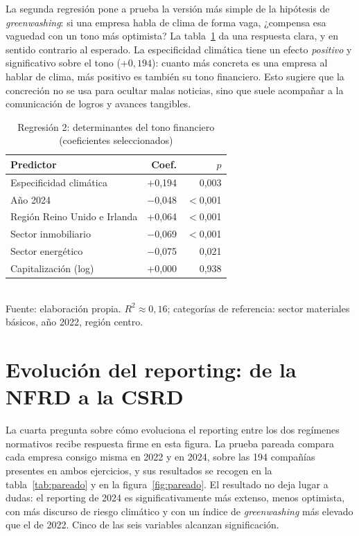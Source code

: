 La segunda regresión pone a prueba la versión más simple de la hipótesis de
\textit{greenwashing}: si una empresa habla de clima de forma vaga, ¿compensa esa
vaguedad con un tono más optimista? La tabla~\ref{tab:reg2} da una respuesta clara, y
en sentido contrario al esperado. La especificidad climática tiene un efecto
\textit{positivo} y significativo sobre el tono ($+0{,}194$): cuanto más concreta es
una empresa al hablar de clima, más positivo es también su tono financiero. Esto
sugiere que la concreción no se usa para ocultar malas noticias, sino que suele
acompañar a la comunicación de logros y avances tangibles.

\begin{table}[H]
\centering
\caption{Regresión 2: determinantes del tono financiero (coeficientes seleccionados)}
\label{tab:reg2}
\begin{tabular}{lrr}
\toprule
\textbf{Predictor} & \textbf{Coef.} & \textbf{$p$} \\
\midrule
Especificidad climática & +0,194 & 0,003 \\
Año 2024 & $-$0,048 & $<$0,001 \\
Región Reino Unido e Irlanda & +0,064 & $<$0,001 \\
Sector inmobiliario & $-$0,069 & $<$0,001 \\
Sector energético & $-$0,075 & 0,021 \\
Capitalización (log) & +0,000 & 0,938 \\
\bottomrule
\end{tabular}
\\[4pt]
{\footnotesize Fuente: elaboración propia. $R^2\approx0{,}16$; categorías de referencia: sector materiales básicos, año 2022, región centro.}
\end{table}

\section{Evolución del reporting: de la NFRD a la CSRD}
\label{sec:res-evolucion}

La cuarta pregunta sobre cómo evoluciona el reporting entre los dos regímenes normativos recibe respuesta firme en esta figura. 
La prueba pareada compara cada empresa consigo misma en 2022 y en 2024, 
sobre las 194 compañías presentes en ambos ejercicios, y sus resultados se
recogen en la tabla~\ref{tab:pareado} y en la figura~\ref{fig:pareado}. El resultado no deja lugar
a dudas: el reporting de 2024 es significativamente más extenso, menos optimista, con más
discurso de riesgo climático y con un índice de \textit{greenwashing} más elevado que el de
2022. Cinco de las seis variables alcanzan significación.

